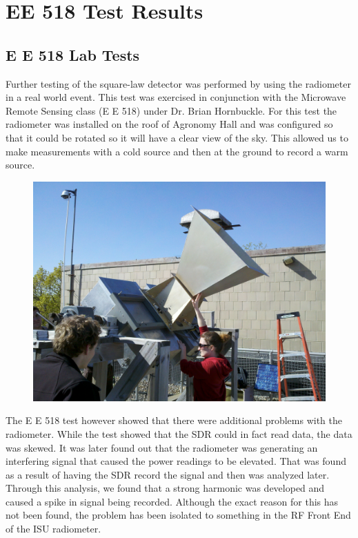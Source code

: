 \chapter{EE 518 Test Results}

\section*{E E 518 Lab Tests}

Further testing of the square-law detector was performed by using the radiometer in a real world event.  This test was exercised in conjunction with the Microwave Remote Sensing class (E E 518) under Dr. Brian Hornbuckle.  For this test the radiometer was installed on the roof of Agronomy Hall and was configured so that it could be rotated so it will have a clear view of the sky.  This allowed us to make measurements with a cold source and then at the ground to record a warm source.


{\begin{figure}[h!tb] 
\centering
\includegraphics[width=\textwidth]{Images/radiometer_roof.jpg}
\label{radiometer_roof}
\end{figure}
}

The E E 518 test however showed that there were additional problems with the radiometer.  While the test showed that the SDR could in fact read data, the data was skewed.  It was later found out that the radiometer was generating an interfering signal that caused the power readings to be elevated.  That was found as a result of having the SDR record the signal and then was analyzed later.  Through this analysis, we found that a strong harmonic was developed and caused a spike in signal being recorded.  Although the exact reason for this has not been found, the problem has been isolated to something in the RF Front End of the ISU radiometer.  